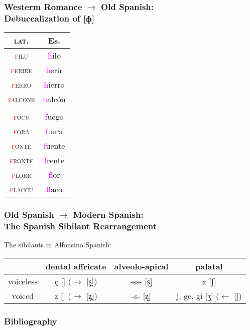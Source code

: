 \documentclass{beamer}
\begin{document}
\begin{frame}
	\frametitle{Westerm Romance $\rightarrow$ Old Spanish: \\ Debuccalization of [ɸ]}

	\begin{center}
		\begin{tabular}{c c}
			\textsc{lat.}                     & Es.                         \\
			\hline
			\textsc{\textcolor{red}{f}ilu}    & \textcolor{magenta}{h}ilo   \\
			\textsc{\textcolor{red}{f}erire}  & \textcolor{magenta}{h}erir  \\
			\textsc{\textcolor{red}{f}erro}   & \textcolor{magenta}{h}ierro \\
			\textsc{\textcolor{red}{f}alcone} & \textcolor{magenta}{h}alcón \\
			                                  &                             \\
			\textsc{\textcolor{red}{f}ocu}    & \textcolor{magenta}{f}uego  \\
			\textsc{\textcolor{red}{f}ora}    & \textcolor{magenta}{f}uera  \\
			\textsc{\textcolor{red}{f}onte}   & \textcolor{magenta}{f}uente \\
			\textsc{\textcolor{red}{f}ronte}  & \textcolor{magenta}{f}rente \\
			\textsc{\textcolor{red}{f}lore}   & \textcolor{magenta}{f}lor   \\
			\textsc{\textcolor{red}{f}laccu}  & \textcolor{magenta}{f}laco  \\
		\end{tabular}
	\end{center}

\end{frame}

\begin{frame}
	\frametitle{Old Spanish $\rightarrow$ Modern Spanish: \\ The Spanish Sibilant Rearrangement}

	The sibilants in Alfonsino Spanish:
	\begin{center}
		\begin{tabular}{c c c c}
			          & dental affricate                                 & alveolo-apical & palatal                                                \\
			\hline
			voiceless & \c{c} [\textipa{\texttslig}] ($\rightarrow$ [s̪]) & -ss- [s̺]       & x [ʃ]                                                  \\
			voiced    & z [\textipa{\textdzlig}] ($\rightarrow$ [z̪])     & -s- [z̺]        & j, ge, gi [ʒ] ($\leftarrow$ [\textipa{\textdyoghlig}]) \\
		\end{tabular}
	\end{center}
\end{frame}

\begin{frame}
	\frametitle{Bibliography}

	\printbibliography
\end{frame}
\end{document}
